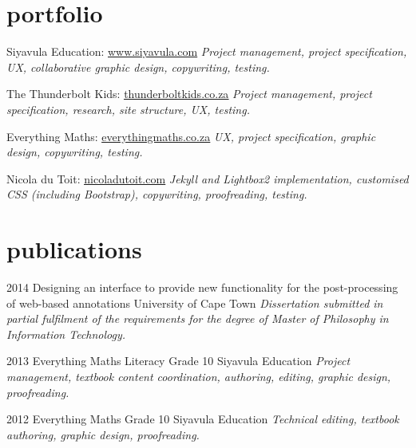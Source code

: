 \documentclass[]{friggeri-cv} %
\begin{document}

\section{portfolio}
\begin{sitelist}

\site
{}
{Siyavula Education: \href{http://www.siyavula.com}{\underline{www.siyavula.com}}}
{}
{\emph{Project management, project specification, UX, collaborative graphic design, copywriting, testing.}}


\site
{}
{The Thunderbolt Kids: \href{http://thunderboltkids.co.za}{\underline{thunderboltkids.co.za}}}
{}
{\emph{Project management, project specification, research, site structure, UX, testing.}}

\site
{}
{Everything Maths: \href{http://www.everythingmaths.co.za}{\underline{everythingmaths.co.za}}}
{}
{\emph{UX, project specification, graphic design, copywriting, testing.}}



\site
{}
{Nicola du Toit: \href{http://www.nicoladutoit.com/ux-portfolio}{\underline{nicoladutoit.com}}}
{}
{\emph{Jekyll and Lightbox2 implementation, customised CSS (including Bootstrap), copywriting, proofreading, testing.}}
\end{sitelist}

\section{publications}
\begin{entrylist}
\entry
{2014}
{Designing an interface to provide new
functionality for the post-processing of
web-based annotations}
{University of Cape Town}
{\emph{
Dissertation submitted in partial fulfilment of the requirements
for the degree of Master of Philosophy in Information Technology.} 
 }



\entry
{2013}
{Everything Maths Literacy Grade 10}
{Siyavula Education}
{\emph{Project management, textbook content coordination, authoring, editing, graphic design, proofreading.}}

\entry
{2012}
{Everything Maths Grade 10}
{Siyavula Education}
{\emph{Technical editing, textbook authoring, graphic design, proofreading.}}

\end{entrylist}
\end{document}
